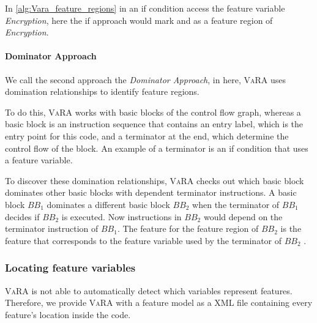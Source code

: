 In \autoref{alg:Vara_feature_regions} in  an if condition access the feature variable \emph{Encryption}, 
here the if approach would mark  and  as a feature region of \emph{Encryption}.

\paragraph{Dominator Approach}
We call the second approach the \emph{Dominator Approach}, in here, \textsc{VaRA} uses domination relationships to identify feature regions.

To do this, \textsc{VaRA} works with basic blocks of the control flow graph, whereas a basic block is an instruction sequence that contains an entry label, 
which is the entry point for this code, and a terminator at the end, which determine the control flow of the block. 
An example of a terminator is an if condition that uses a feature variable.

To discover these domination relationships, \textsc{VaRA} checks out which basic block dominates other basic blocks with dependent terminator instructions. 
A basic block $BB_1$ dominates a different basic block $BB_2$ when the terminator of $BB_1$ decides if $BB_2$ is executed. 
Now instructions in $BB_2$ would depend on the terminator instruction of $BB_1$. 
The feature for the feature region of $BB_2$ is the feature that corresponds to the feature variable used by the terminator of $BB_2$ \cite{VaRA-Tom}.


\subsubsection{Locating feature variables}
\textsc{VaRA} is not able to automatically detect which variables represent features. 
Therefore, we provide \textsc{VaRA} with a feature model as a \textsc{XML} file containing every feature's location inside the code.

